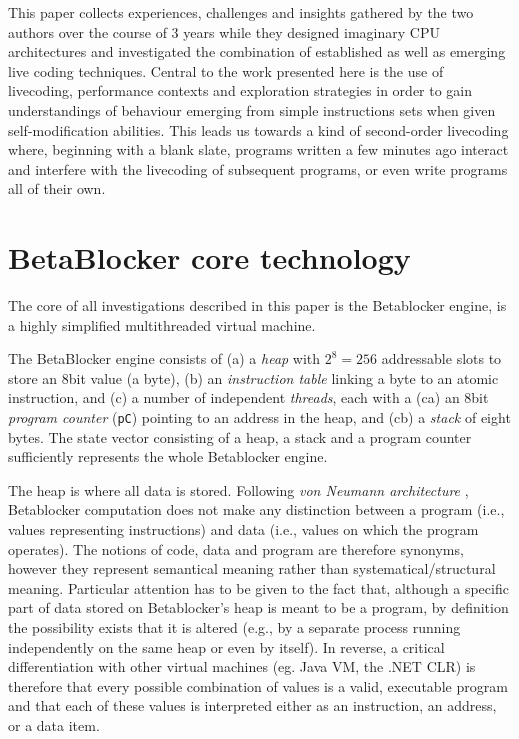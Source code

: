 \documentclass[letterpaper, 12pt]{article}
\begin{document}
This paper collects experiences, challenges and insights gathered by the two authors over the course of 3 years while they designed imaginary CPU architectures and investigated the combination of established as well as emerging live coding techniques.
Central to the work presented here is the use of livecoding, performance contexts and exploration strategies in order to gain understandings of behaviour emerging from simple instructions sets when given self-modification abilities. 
This leads us towards a kind of second-order livecoding where, beginning with a blank slate, programs written a few minutes ago interact and interfere with the livecoding of subsequent programs, or even write programs all of their own.

\parskip 18pt

\section{BetaBlocker core technology} 
\label{sec:betablocker_core}


The core of all investigations described in this paper is the Betablocker engine, is a highly simplified multithreaded virtual machine.

The BetaBlocker engine consists of 
(a) a \emph{heap} with  $2^8 = 256$ addressable slots to store an 8bit value (a byte), 
(b) an \emph{instruction table} linking a byte to an atomic instruction, and
(c) a number of independent \emph{threads}, each with a 
	(ca) an 8bit \emph{program counter} (\texttt{pC}) pointing to an address in the heap, and (cb) a \emph{stack} of eight bytes.
The state vector consisting of a heap, a stack and a program counter sufficiently represents the whole Betablocker engine.

The heap is where all data is stored. 
Following \emph{von Neumann architecture} \citep*{von-neumann1993-fir}, Betablocker computation does not make any distinction between a program (i.e., values representing instructions) and data (i.e., values on which the program operates). 
The notions of code, data and program are therefore synonyms, however they represent semantical meaning rather than systematical/structural meaning.
Particular attention has to be given to the fact that, although a specific part of data stored on Betablocker's heap is meant to be a program, by definition the possibility exists that it is altered (e.g., by a separate process running independently on the same heap or even by itself).
In reverse, a critical differentiation with other virtual machines (eg. Java VM, the .NET CLR) is therefore that every possible combination of values is a valid, executable program and that each of these values is interpreted either as an instruction, an address, or a data item. 
\end{document}
